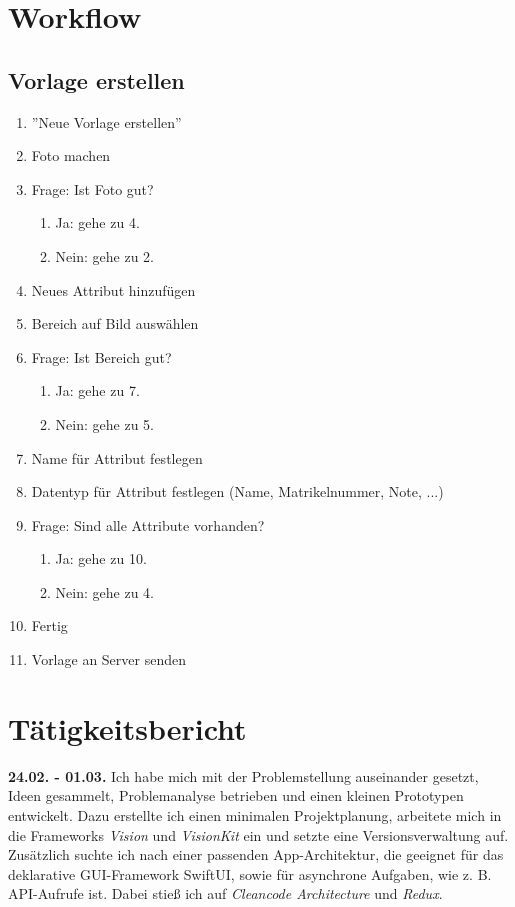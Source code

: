\documentclass[nomenclature, oneside, 150]{HSMW-Thesis}
\begin{document}
\Anhang

\chapter{Workflow} \label{ch:workflow}
	\section*{Vorlage erstellen}
	\begin{enumerate}
		\item ''Neue Vorlage erstellen''
		\item Foto machen
		\item Frage: Ist Foto gut? 
		\begin{enumerate}
			\item Ja: gehe zu 4.
			\item Nein: gehe zu 2.
		\end{enumerate}
		\item Neues Attribut hinzufügen
		\item Bereich auf Bild auswählen
		\item Frage: Ist Bereich gut?
		\begin{enumerate}
			\item Ja: gehe zu 7.
			\item Nein: gehe zu 5.
		\end{enumerate}
		\item Name für Attribut festlegen
		\item Datentyp für Attribut festlegen (Name, Matrikelnummer, Note, ...)
		\item Frage: Sind alle Attribute vorhanden?
		\begin{enumerate}
			\item Ja: gehe zu 10.
			\item Nein: gehe zu 4.
		\end{enumerate}
		\item Fertig
		\item Vorlage an Server senden
	\end{enumerate}
	

\chapter{Tätigkeitsbericht}
	\textbf{24.02. - 01.03.}
	Ich habe mich mit der Problemstellung auseinander gesetzt, Ideen gesammelt, Problemanalyse betrieben und einen kleinen Prototypen entwickelt. Dazu erstellte ich einen minimalen Projektplanung, arbeitete mich in die Frameworks \textit{Vision} und \textit{VisionKit} ein und setzte eine Versionsverwaltung auf. Zusätzlich suchte ich nach einer passenden App-Architektur, die geeignet für das deklarative GUI-Framework SwiftUI, sowie für asynchrone Aufgaben, wie z. B. API-Aufrufe ist. Dabei stieß ich auf \textit{Cleancode Architecture} und \textit{Redux}.
	
\end{document}
